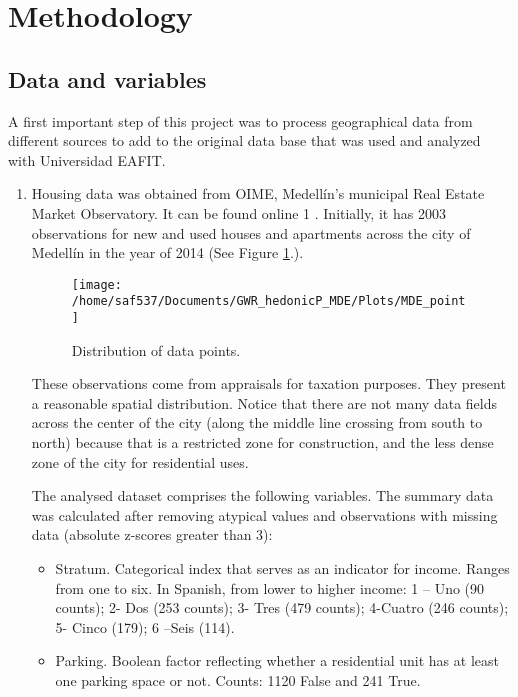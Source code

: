 \documentclass[journal]{IEEEtran}
\begin{document}
\section{Methodology}

\subsection{Data and variables}

A first important step of this project was to process geographical data from different sources to add to the original data base that was used and analyzed with Universidad EAFIT.

\begin{enumerate}
\item Housing data was obtained from OIME, Medellín’s municipal Real Estate Market Observatory. It can be found online 1 . Initially, it has 2003 observations for new and used houses and apartments across the city of Medellín in the year of 2014 (See Figure \ref{fig_sim}.).


\begin{figure}[!t]
\centering
\texttt{[image: /home/saf537/Documents/GWR\_hedonicP\_MDE/Plots/MDE\_point]}
\caption{Distribution of data points.}
\label{fig_sim}
\end{figure}

These observations come from appraisals for
taxation purposes. They present a reasonable spatial
distribution. Notice that there are not many data
fields across the center of the city (along the middle
line crossing from south to north) because that is a
restricted zone for construction, and the less dense
zone of the city for residential uses.

The analysed dataset comprises the following
variables. The summary data was calculated after
removing atypical values and observations with
missing data (absolute z-scores greater than 3):

\begin{itemize}
\item Stratum. Categorical index that serves as an
indicator for income. Ranges from one to six. In
Spanish, from lower to higher income: 1 – Uno
(90 counts); 2- Dos (253 counts); 3- Tres (479 counts); 4-Cuatro (246 counts); 5- Cinco (179);
6 –Seis (114).

\item Parking. Boolean factor reflecting whether a residential unit has at least one parking space or not. Counts: 1120 False and 241 True.


\end{itemize}
\end{enumerate}
\end{document}
